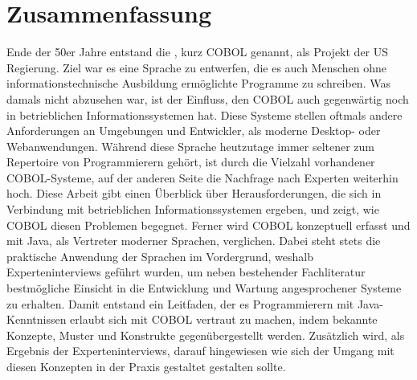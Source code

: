 \chapter*{Zusammenfassung} 

Ende der 50er Jahre entstand die , kurz COBOL genannt, als Projekt der US Regierung. Ziel war es eine Sprache zu entwerfen, die es auch Menschen ohne informationstechnische Ausbildung ermöglichte Programme zu schreiben. Was damals nicht abzusehen war, ist der Einfluss, den COBOL auch gegenwärtig noch in betrieblichen Informationssystemen hat. Diese Systeme stellen oftmals andere Anforderungen an Umgebungen und Entwickler, als moderne Desktop- oder Webanwendungen. Während diese Sprache heutzutage immer seltener zum Repertoire von Programmierern gehört, ist durch die Vielzahl vorhandener COBOL-Systeme, auf der anderen Seite die Nachfrage nach Experten weiterhin hoch. Diese Arbeit gibt einen Überblick über Herausforderungen, die sich in Verbindung mit betrieblichen Informationssystemen ergeben, und zeigt, wie COBOL diesen Problemen begegnet. Ferner wird COBOL konzeptuell erfasst und mit Java, als Vertreter moderner Sprachen, verglichen. Dabei steht stets die praktische Anwendung der Sprachen im Vordergrund, weshalb Experteninterviews geführt wurden, um neben bestehender Fachliteratur bestmögliche Einsicht in die Entwicklung und Wartung angesprochener Systeme zu erhalten. Damit entstand ein Leitfaden, der es Programmierern mit Java-Kenntnissen erlaubt sich mit COBOL vertraut zu machen, indem bekannte Konzepte, Muster und Konstrukte gegenübergestellt werden. Zusätzlich wird, als Ergebnis der Experteninterviews, darauf hingewiesen wie sich der Umgang mit diesen Konzepten in der Praxis gestaltet \bzw gestalten sollte. 